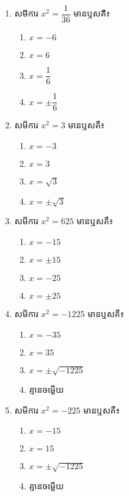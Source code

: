 \begin{enumerate}
\item សមីការ $x^2=\dfrac{1}{36}$ មានឬសគឺ៖
\begin{multicols}{4}
\begin{enumerate}[label=\alph*.]
	\item $x=-6$
	\item $x=6$
	\item $x=\dfrac{1}{6}$
	\item $x=\pm \dfrac{1}{6}$
\end{enumerate}
\end{multicols}

\item សមីការ $x^2=3$ មានឬសគឺ៖
\begin{multicols}{4}
\begin{enumerate}[label=\alph*.]
	\item $x=-3$
	\item $x=3$
	\item $x=\sqrt{3}$
	\item $x=\pm \sqrt{3}$
\end{enumerate}
\end{multicols}

\item សមីការ $x^2=625$ មានឬសគឺ៖
\begin{multicols}{4}
\begin{enumerate}[label=\alph*.]
	\item $x=-15$
	\item $x=\pm 15$
	\item $x=-25$
	\item $x=\pm 25$
\end{enumerate}
\end{multicols}

\item សមីការ $x^2=-1225$ មានឬសគឺ៖
\begin{multicols}{4}
\begin{enumerate}[label=\alph*.]
	\item $x=-35$
	\item $x=35$
	\item $x=\pm \sqrt{-1225}$
	\item គ្មានចម្លើយ
\end{enumerate}
\end{multicols}

\item សមីការ $x^2=-225$ មានឬសគឺ៖
\begin{multicols}{4}
\begin{enumerate}[label=\alph*.]
	\item $x=-15$
	\item $x=15$
	\item $x=\pm \sqrt{-1225}$
	\item គ្មានចម្លើយ
\end{enumerate}
\end{multicols}


\end{enumerate}
